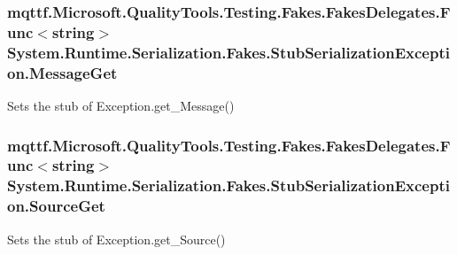 \hypertarget{class_system_1_1_runtime_1_1_serialization_1_1_fakes_1_1_stub_serialization_exception_a7242fc12658fe7b70f8b6449ddd41aab}{
\subsubsection[{Message\-Get}]{\setlength{\rightskip}{0pt plus 5cm}mqttf.\-Microsoft.\-Quality\-Tools.\-Testing.\-Fakes.\-Fakes\-Delegates.\-Func$<$string$>$ System.\-Runtime.\-Serialization.\-Fakes.\-Stub\-Serialization\-Exception.\-Message\-Get}}\label{class_system_1_1_runtime_1_1_serialization_1_1_fakes_1_1_stub_serialization_exception_a7242fc12658fe7b70f8b6449ddd41aab}


Sets the stub of Exception.\-get\-\_\-\-Message()

\hypertarget{class_system_1_1_runtime_1_1_serialization_1_1_fakes_1_1_stub_serialization_exception_a32ea6bfceea26d5624605553c394f4a8}{
\subsubsection[{Source\-Get}]{\setlength{\rightskip}{0pt plus 5cm}mqttf.\-Microsoft.\-Quality\-Tools.\-Testing.\-Fakes.\-Fakes\-Delegates.\-Func$<$string$>$ System.\-Runtime.\-Serialization.\-Fakes.\-Stub\-Serialization\-Exception.\-Source\-Get}}\label{class_system_1_1_runtime_1_1_serialization_1_1_fakes_1_1_stub_serialization_exception_a32ea6bfceea26d5624605553c394f4a8}


Sets the stub of Exception.\-get\-\_\-\-Source()

